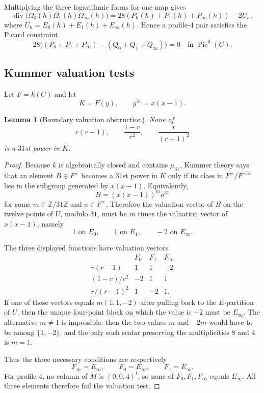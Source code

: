 \documentclass[11pt]{amsart}
\newtheorem{lemma}[theorem]{Lemma}
\newcommand{\Div}{\operatorname{div}}
\newcommand{\Pic}{\operatorname{Pic}}
\begin{document}
Multiplying the three logarithmic forms for one map gives
\[
  \Div\bigl(\Omega_0(h)\Omega_1(h)\Omega_\infty(h)\bigr)
  =28(P_0(h)+P_1(h)+P_\infty(h))-2U_h,
\]
where \(U_h=E_0(h)+E_1(h)+E_\infty(h)\).  Hence a profile-\(4\) pair satisfies
the Picard constraint
\[
  28\bigl((P_0+P_1+P_\infty)-(Q_0+Q_1+Q_\infty)\bigr)=0
  \quad\text{in }\Pic^0(C).
\]

\subsection{Kummer valuation tests}

Let \(F=k(C)\) and let
\[
  K=F(y),\qquad y^{31}=x(x-1).
\]

\begin{lemma}[Boundary valuation obstruction]
\label{lem:kummer-valuation}
None of
\[
  r(r-1),\qquad \frac{1-r}{r^2},\qquad \frac{r}{(r-1)^2}
\]
is a \(31\)st power in \(K\).
\end{lemma}

\begin{proof}
Because \(k\) is algebraically closed and contains \(\mu_{31}\), Kummer theory
says that an element \(B\in F^\times\) becomes a \(31\)st power in \(K\) only
if its class in \(F^\times/F^{\times31}\) lies in the subgroup generated by
\(x(x-1)\).  Equivalently,
\[
  B=(x(x-1))^m a^{31}
\]
for some \(m\in\mathbb Z/31\mathbb Z\) and \(a\in F^\times\).  Therefore the
valuation vector of \(B\) on the twelve points of \(U\), modulo \(31\), must
be \(m\) times the valuation vector of \(x(x-1)\), namely
\[
  1\text{ on }E_0,\qquad 1\text{ on }E_1,\qquad -2\text{ on }E_\infty.
\]

The three displayed functions have valuation vectors
\[
\begin{array}{c|ccc}
        &F_0&F_1&F_\infty\\ \hline
r(r-1)&1&1&-2\\
(1-r)/r^2&-2&1&1\\
r/(r-1)^2&1&-2&1 .
\end{array}
\]
If one of these vectors equals \(m(1,1,-2)\) after pulling back to the
\(E\)-partition of \(U\), then the unique four-point block on which the value
is \(-2\) must be \(E_\infty\).  The alternative \(m\ne1\) is impossible:
then the two values \(m\) and \(-2m\) would have to be among \(\{1,-2\}\), and
the only such scalar preserving the multiplicities \(8\) and \(4\) is
\(m=1\).

Thus the three necessary conditions are respectively
\[
  F_\infty=E_\infty,\qquad F_0=E_\infty,\qquad F_1=E_\infty.
\]
For profile \(4\), no column of \(M\) is \((0,0,4)^t\), so none of
\(F_0,F_1,F_\infty\) equals \(E_\infty\).  All three elements therefore fail
the valuation test.
\end{proof}
\end{document}
